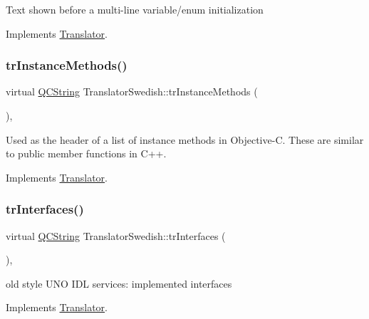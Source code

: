 Text shown before a multi-\/line variable/enum initialization 

Implements \mbox{\hyperlink{class_translator}{Translator}}.

\mbox{\label{class_translator_swedish_af025b5bf067e1ea3ee1ba786675d4f46}} 
\subsubsection{\texorpdfstring{trInstanceMethods()}{trInstanceMethods()}}
{\footnotesize\ttfamily virtual \mbox{\hyperlink{class_q_c_string}{Q\+C\+String}} Translator\+Swedish\+::tr\+Instance\+Methods (\begin{DoxyParamCaption}{ }\end{DoxyParamCaption})\hspace{0.3cm}{\ttfamily [inline]}, {\ttfamily [virtual]}}

Used as the header of a list of instance methods in Objective-\/C. These are similar to public member functions in C++. 

Implements \mbox{\hyperlink{class_translator}{Translator}}.

\mbox{\label{class_translator_swedish_ad41398662cd7409861e50c589fb3061d}} 
\subsubsection{\texorpdfstring{trInterfaces()}{trInterfaces()}}
{\footnotesize\ttfamily virtual \mbox{\hyperlink{class_q_c_string}{Q\+C\+String}} Translator\+Swedish\+::tr\+Interfaces (\begin{DoxyParamCaption}{ }\end{DoxyParamCaption})\hspace{0.3cm}{\ttfamily [inline]}, {\ttfamily [virtual]}}

old style U\+NO I\+DL services\+: implemented interfaces 

Implements \mbox{\hyperlink{class_translator}{Translator}}.

\mbox{\label{class_translator_swedish_a8d59d591c99fb0a1fa7b71f1ee840e8d}} 
